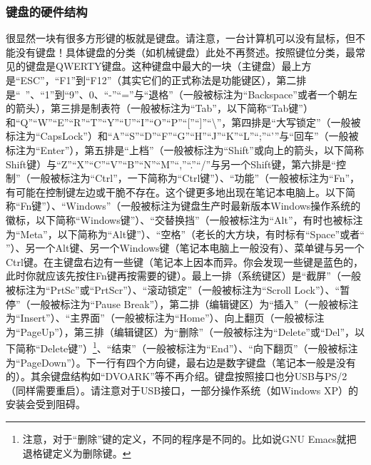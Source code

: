 \subsubsection{键盘的硬件结构}
很显然一块有很多方形键的板就是键盘。请注意，一台计算机可以没有鼠标，但不能没有键盘！具体键盘的分类（如机械键盘）此处不再赘述。按照键位分类，最常见的键盘是QWERTY键盘。这种键盘中最大的一块（主键盘）最上方是“ESC”，“F1”到“F12”（其实它们的正式称法是功能键区），第二排是“~”、“1”到“9”、0、“-”“=”与“退格”（一般被标注为“Backspace”或者一个朝左的箭头），第三排是制表符（一般被标注为“Tab”，以下简称“Tab键”）和“Q”“W”“E”“R”“T”“Y”“U”“I”“O”“P”“[”“]”“\textbackslash”，第四排是“大写锁定”（一般被标注为“CapsLock”）和“A”“S”“D”“F”“G”“H”“J”“K”“L”“;”“'”与“回车”（一般被标注为“Enter”），第五排是“上档”（一般被标注为“Shift”或向上的箭头，以下简称Shift键）与“Z”“X”“C”“V”“B”“N”“M”“,”“.”“/”与另一个Shift键，第六排是“控制”（一般被标注为“Ctrl”，一下简称为“Ctrl键”）、“功能”（一般被标注为“Fn”，有可能在控制键左边或干脆不存在。这个键更多地出现在笔记本电脑上。以下简称“Fn键”）、“Windows”（一般被标注为键盘生产时最新版本Windows操作系统的徽标，以下简称“Windows键”）、“交替换挡”（一般被标注为“Alt”，有时也被标注为“Meta”，以下简称为“Alt键”）、“空格”（老长的大方块，有时标有“Space”或者“\verb*| |”）、另一个Alt键、另一个Windows键（笔记本电脑上一般没有）、菜单键与另一个Ctrl键。在主键盘右边有一些键（笔记本上因本而异。你会发现一些键是蓝色的，此时你就应该先按住Fn键再按需要的键）。最上一排（系统键区）是“截屏”（一般被标注为“PrtSc”或“PrtScr”）、“滚动锁定”（一般被标注为“Scroll Lock”）、“暂停”（一般被标注为“Pause Break”），第二排（编辑键区）为“插入”（一般被标注为“Insert”）、“主界面”（一般被标注为“Home”）、向上翻页（一般被标注为“PageUp”），第三排（编辑键区）为“删除”（一般被标注为“Delete”或“Del”，以下简称“Delete键”）\footnote{注意，对于“删除”键的定义，不同的程序是不同的。比如说GNU Emacs就把退格键定义为删除键。}、“结束”（一般被标注为“End”）、“向下翻页”（一般被标注为“PageDown”）。下一行有四个方向键，最右边是数字键盘（笔记本一般是没有的）。其余键盘结构如“DVOARK”等不再介绍。键盘按照接口也分USB与PS/2（同样需要重启）。请注意对于USB接口，一部分操作系统（如Windows XP）的安装会受到阻碍。
